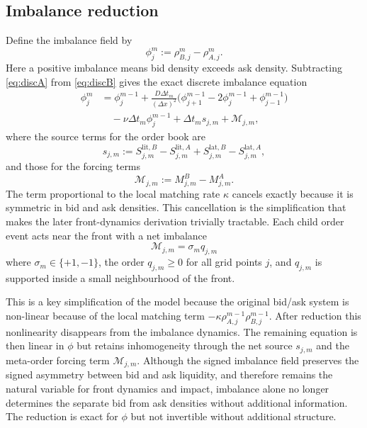 \documentclass[5p,final]{elsarticle}
\begin{document}
\subsection{Imbalance reduction}
\label{sec:imbalance}
Define the imbalance field by
\begin{equation}
    \phi_j^m:=\rho_{B,j}^m-\rho_{A,j}^m.
\end{equation}
Here a positive imbalance means bid density exceeds ask density. Subtracting \cref{eq:discA} from \cref{eq:discB} gives the exact discrete imbalance equation
\begin{align}
    \phi_j^m
    &=\phi_j^{m-1}
    +\frac{D\Delta t_m}{(\Delta x)^2}\bigl(\phi_{j+1}^{m-1}-2\phi_j^{m-1}+\phi_{j-1}^{m-1}\bigr)
  \nonumber \\ &\quad -
    \nu\Delta t_m\phi_j^{m-1}
    +
    \Delta t_m s_{j,m}
    +
    \mathcal M_{j,m},
\label{eq:discimb}
\end{align}
where the source terms for the order book are
\begin{equation}
s_{j,m}:=S_{j,m}^{\mathrm{lit},B}-S_{j,m}^{\mathrm{lit},A}+S_{j,m}^{\mathrm{lat},B}-S_{j,m}^{\mathrm{lat},A},
\end{equation}
and those for the forcing terms
\begin{equation}
    \mathcal M_{j,m}:=M_{j,m}^{B}-M_{j,m}^{A}.
\end{equation}
The term proportional to the local matching rate $\kappa$ cancels exactly because it is symmetric in bid and ask densities. This cancellation is the simplification that makes the later front-dynamics derivation trivially tractable. Each child order event acts near the front with a net imbalance
\begin{equation}
    \mathcal M_{j,m} = \sigma_m q_{j,m}
\end{equation}
where $\sigma_m \in \{ +1,-1\}$, the order $q_{j,m}\ge0$ for all grid points $j$, and $q_{j,m}$ is supported inside a small neighbourhood of the front. 

This is a key simplification of the model because the original bid/ask system is non-linear because of the local matching term $-\kappa \rho_{A,j}^{m-1} \rho_{B,j}^{m-1}$. After reduction this nonlinearity disappears from the imbalance dynamics. The remaining equation is then linear in $\phi$ but retains inhomogeneity through the net source $s_{j,m}$ and the meta-order forcing term $\mathcal M_{j,m}$. Although the signed imbalance field preserves the signed asymmetry between bid and ask liquidity, and therefore remains the natural variable for front dynamics and impact, imbalance alone no longer determines the separate bid from ask densities without additional information. The reduction is exact for $\phi$ but not invertible without additional structure. 
\end{document}
